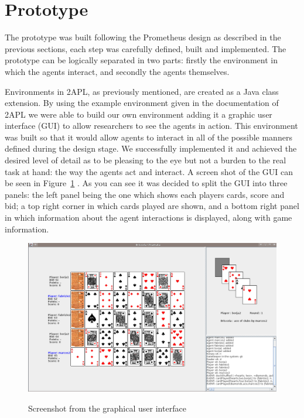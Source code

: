 \documentclass[a4paper]{article}
\begin{document}
\section{Prototype}\label{sec:proto} 

The prototype was built following the Prometheus design as described in the previous sections, each step was carefully defined, built and implemented. %
The prototype can be logically separated in two parts: firstly the environment in which the agents interact, and secondly the agents themselves.

Environments in 2APL, as previously mentioned, are created as a Java class extension. By using the example environment given in the documentation of 2APL we were able to build our own environment adding it a graphic user interface (GUI) to allow researchers to see the agents in action. This environment was built so that it would allow agents to interact in all of the possible manners defined during the design stage. We successfully implemented it and achieved the desired level of detail as to be pleasing to the eye but not a burden to the real task at hand: the way the agents act and interact. A screen shot of the GUI can be seen in Figure~\ref{fig:gui1} . As you can see it was decided to split the GUI into three panels: the left panel being the one which shows each players cards, score and bid; a top right corner in which cards played are shown, and a bottom right panel in which information about the agent interactions is displayed, along with game information.

\begin{figure}[htp]
  \includegraphics[keepaspectratio,scale=0.3]{fig/gui1.png}
  \label{fig:gui1}
  \caption{Screenshot from the graphical user interface}
\end{figure}
\end{document}
